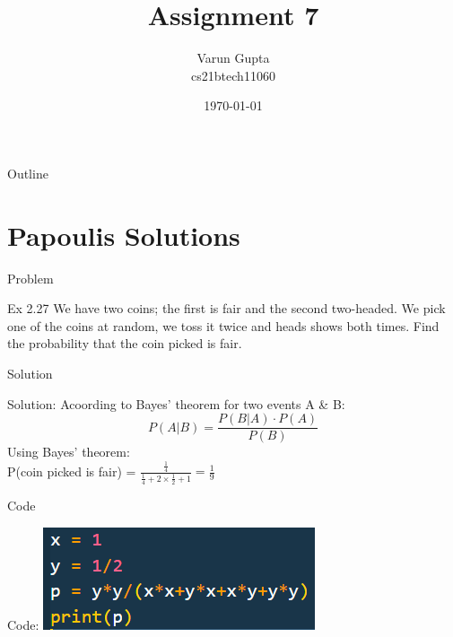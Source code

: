 \documentclass{beamer}
\title{Assignment 7}
\author{Varun Gupta \\ cs21btech11060}
\date{\today}
\begin{document}
\begin{frame}
    \titlepage
\end{frame}

\logo{}


\begin{frame}{Outline}
    \tableofcontents
\end{frame}
\section{Papoulis Solutions}
\begin{frame}{Problem}
    \begin{block}{Ex 2.27}
        We have two coins; the first is fair and the second two-headed. We pick one of the coins
        at random, we toss it twice and heads shows both times. Find the probability that the coin
        picked is fair.
    \end{block}
\end{frame}
\begin{frame}{Solution}
    \begin{block}{Solution:}
        Acoording to Bayes' theorem for two events A \& B:
        \begin{equation}
            P(A|B) = \frac{P(B|A) \cdot P(A)}{P(B)}
        \end{equation}
        Using Bayes' theorem:\\
            P(coin picked is fair) = $\frac{\frac{1}{4}}{\frac{1}{4}+2 \times \frac{1}{2}+1} = \frac{1}{9}$
    \end{block}
\end{frame}
\begin{frame}{Code}
    \begin{block}{Code:}
        \includegraphics{figures/fig1.png}
    \end{block}
\end{frame}
\end{document}
